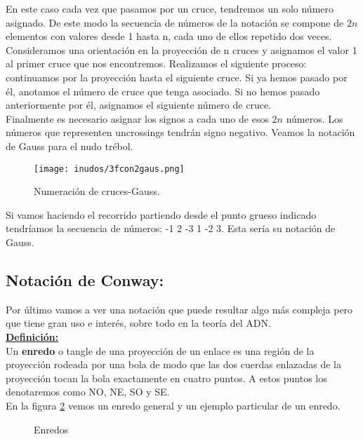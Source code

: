 En este caso cada vez que pasamos por un cruce, tendremos un solo número asignado. De este modo la secuencia de números de la notación se compone de $2n$ elementos con valores desde 1 hasta n, cada uno de ellos repetido dos veces.\\

Consideramos una orientación en la proyección de n cruces y asignamos el valor 1 al primer cruce que nos encontremos. Realizamos el siguiente proceso: continuamos por la proyección hasta el siguiente cruce. Si ya hemos pasado por él, anotamos el número de cruce que tenga asociado. Si no hemos pasado anteriormente por él, asignamos el siguiente número de cruce.\\

Finalmente es necesario asignar los signos a cada uno de esos $2n$ números. Los números que representen uncrossings tendrán signo negativo. Veamos la notación de Gauss para el nudo trébol.\\
   \begin{figure}[h!]
   	\centering
   	\texttt{[image: inudos/3fcon2gaus.png]}
   	\caption{Numeración de cruces-Gauss.}
   	\label{gaus1} 
   \end{figure} 
Si vamos haciendo el recorrido partiendo desde el punto grueso indicado tendríamos la secuencia de números: -1 2 -3 1 -2 3. Esta sería su notación de Gauss.

\begin{center}
	\item \subsection{Notación de Conway:}
\end{center}
Por último vamos a ver una notación que puede resultar algo más compleja pero que tiene gran uso e interés, sobre todo en la teoría del ADN. \\

\underline{\textbf{Definición:}}\\
Un \textbf{enredo} o tangle de una proyección de un enlace es una región de la proyección rodeada por una bola de modo que las dos cuerdas enlazadas de la proyección tocan la bola exactamente en cuatro puntos. A estos puntos los denotaremos como NO, NE, SO y SE.\\

En la figura \ref{conw1} vemos un enredo general y un ejemplo particular de un enredo.\\
   \begin{figure}[h!]
   	\centering
   	\caption{Enredos}
   	\label{conw1} 
   \end{figure} 

